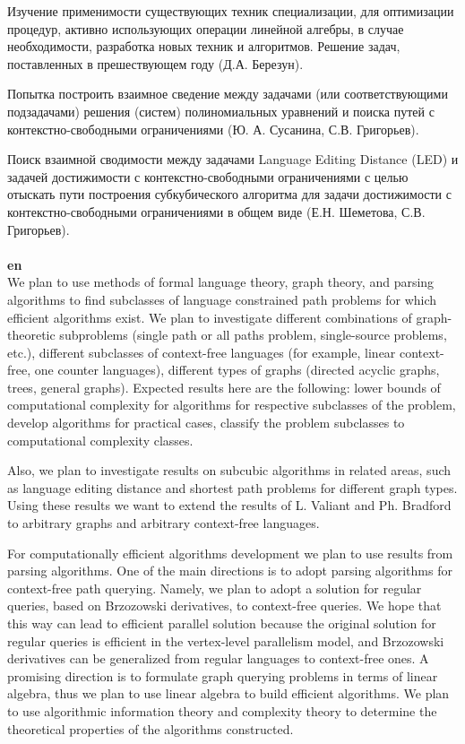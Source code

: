 \documentclass[12pt]{article}  %
\theoremstyle{remark}
\begin{document}
Изучение применимости существующих техник специализации, для оптимизации процедур, активно использующих операции линейной алгебры, в случае необходимости, разработка новых техник и алгоритмов. Решение задач, поставленных в прешествующем году (Д.А. Березун).

Попытка построить взаимное сведение между задачами (или соответствующими подзадачами) решения (систем) полиномиальных уравнений и поиска путей с контекстно-свободными ограничениями (Ю. А. Сусанина, С.В. Григорьев).

Поиск взаимной сводимости между задачами Language Editing Distance (LED) и задачей достижимости с контекстно-свободными ограничениями с целью отыскать пути построения субкубического алгоритма для задачи достижимости с контекстно-свободными ограничениями в общем виде (Е.Н. Шеметова, С.В. Григорьев).
\\
\\
\textbf{en}\\
We plan to use methods of formal language theory, graph theory, and parsing algorithms to find subclasses of language constrained path problems for which efficient algorithms exist.
We plan to investigate different combinations of graph-theoretic subproblems (single path or all paths problem, single-source problems, etc.), different subclasses of context-free languages (for example, linear context-free, one counter languages), different types of graphs (directed acyclic graphs, trees, general graphs).
Expected results here are the following: lower bounds of computational complexity for algorithms for respective subclasses of the problem, develop algorithms for practical cases, classify the problem subclasses to computational complexity classes.

Also, we plan to investigate results on subcubic algorithms in related areas, such as language editing distance and shortest path problems for different graph types.
Using these results we want to extend the results of L. Valiant and Ph. Bradford to arbitrary graphs and arbitrary context-free languages.

For computationally efficient algorithms development we plan to use results from parsing algorithms.
One of the main directions is to adopt parsing algorithms for context-free path querying.
Namely, we plan to adopt a solution for regular queries, based on Brzozowski derivatives, to context-free queries.
We hope that this way can lead to efficient parallel solution because the original solution for regular queries is efficient in the vertex-level parallelism model, and Brzozowski derivatives can be generalized from regular languages to context-free ones.
A promising direction is to formulate graph querying problems in terms of linear algebra, thus we plan to use linear algebra to build efficient algorithms.
We plan to use algorithmic information theory and complexity theory to determine the theoretical properties of the algorithms constructed.
\end{document}
